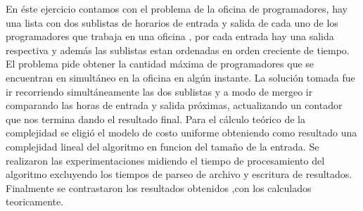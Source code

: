 En éste ejercicio contamos con el problema de la oficina de programadores, hay una lista con dos sublistas de horarios de entrada y salida de cada uno de los programadores que trabaja en una oficina , por cada entrada hay una salida respectiva y además las sublistas estan ordenadas en orden creciente de tiempo.
\newline
El problema pide obtener la cantidad máxima de programadores que se encuentran en simultáneo en la oficina en algún instante.
\newline
La solución tomada fue ir recorriendo simultáneamente las dos sublistas y a modo de mergeo ir comparando las horas de entrada y salida próximas, actualizando un contador que nos termina dando el resultado final.
\newline
Para el cálculo teórico de la complejidad se eligió el modelo de costo uniforme obteniendo como resultado una complejidad lineal del algoritmo en funcion del tamaño de la entrada.
\newline
Se realizaron las experimentaciones midiendo el tiempo de procesamiento del algoritmo excluyendo los tiempos de parseo de archivo y escritura de resultados.
Finalmente se contrastaron los resultados obtenidos ,con los calculados teoricamente. 